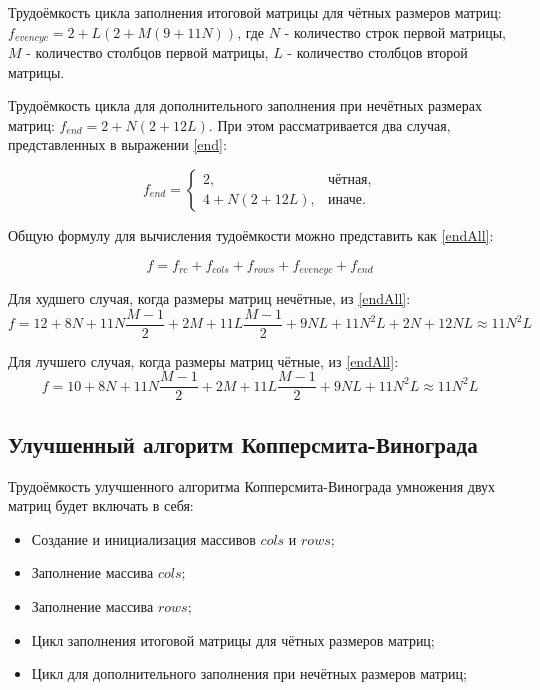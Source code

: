 \documentclass[12pt]{report}
\begin{document}
Трудоёмкость цикла заполнения итоговой матрицы для чётных размеров матриц: $f_{evencyc} = 2 + L(2 + M(9 + 11N))$, где $N$ - количество строк первой матрицы, $M$ - количество столбцов первой матрицы, $L$ - количество столбцов второй матрицы.

Трудоёмкость цикла для дополнительного заполнения при нечётных размерах матриц: $f_{end} = 2 + N(2 + 12L)$. При этом рассматривается два случая, представленных в выражении \ref{end}:

\begin{equation}
	\label{end}
            f_{end} = \begin{cases}
                2, & \text{чётная,}\\
                4 + N(2 + 12L), & \text{иначе.}
            \end{cases}
        \end{equation}
        
Общую формулу для вычисления тудоёмкости можно представить как \ref{endAll}:

\begin{equation}
	\label{endAll}
	f = f_{rc} + f_{cols} + f_{rows} + f_{evencyc} + f_{end}
\end{equation}

Для худшего случая, когда размеры матриц нечётные, из \ref{endAll}:
\begin{equation}
	\label{bad}
	f = 12 +8N + 11N\frac{M - 1}{2} + 2M + 11L\frac{M-1}{2}+ 9NL + 11N^{2}L + 2N + 12NL \approx 11N^{2}L
\end{equation}

Для лучшего случая, когда размеры матриц чётные, из \ref{endAll}:
\begin{equation}
	\label{good}
	f = 10 + 8N + 11N\frac{M - 1}{2} + 2M + 11L\frac{M-1}{2}+ 9NL + 11N^{2}L\approx 11N^{2}L
\end{equation}

\subsection{Улучшенный алгоритм Копперсмита-Винограда}
Трудоёмкость улучшенного алгоритма Копперсмита-Винограда умножения двух матриц будет включать в себя:
\begin{itemize}
\item Создание и инициализация массивов $cols$ и $rows$;
\item Заполнение массива $cols$;
\item Заполнение массива $rows$;
\item Цикл заполнения итоговой матрицы для чётных размеров матриц;
\item Цикл для дополнительного заполнения при нечётных размеров матриц;
\end{itemize}
\end{document}
